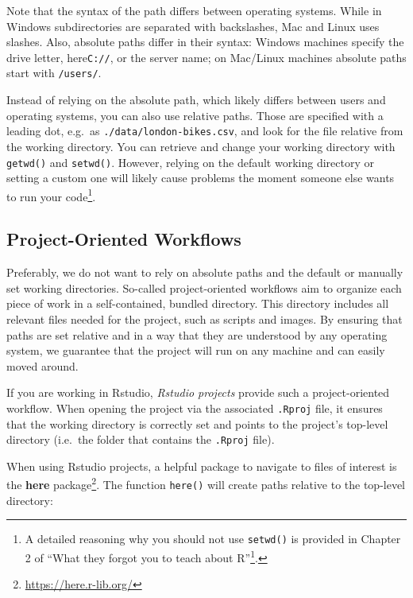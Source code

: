 \documentclass[
]{krantz}
\renewcommand{\href}[2]{#2\footnote{\url{#1}}}
\begin{document}
Note that the syntax of the path differs between operating systems. While in Windows subdirectories are separated with backslashes, Mac and Linux uses slashes. Also, absolute paths differ in their syntax: Windows machines specify the drive letter, here\texttt{C://}, or the server name; on Mac/Linux machines absolute paths start with \texttt{/users/}.

Instead of relying on the absolute path, which likely differs between users and operating systems, you can also use relative paths. Those are specified with a leading dot, e.g.~as \texttt{./data/london-bikes.csv}, and look for the file relative from the working directory. You can retrieve and change your working directory with \texttt{getwd()} and \texttt{setwd()}. However, relying on the default working directory or setting a custom one will likely cause problems the moment someone else wants to run your code\footnote{A detailed reasoning why you should not use \texttt{setwd()} is provided in \href{https://rstats.wtf/project-oriented-workflow.html}{Chapter 2 of ``What they forgot you to teach about R''}.}.

\hypertarget{workflows}{%
\subsection{Project-Oriented Workflows}\label{workflows}}

Preferably, we do not want to rely on absolute paths and the default or manually set working directories. So-called project-oriented workflows aim to organize each piece of work in a self-contained, bundled directory. This directory includes all relevant files needed for the project, such as scripts and images. By ensuring that paths are set relative and in a way that they are understood by any operating system, we guarantee that the project will run on any machine and can easily moved around.

If you are working in Rstudio, \emph{Rstudio projects} provide such a project-oriented workflow. When opening the project via the associated \texttt{.Rproj} file, it ensures that the working directory is correctly set and points to the project's top-level directory (i.e.~the folder that contains the \texttt{.Rproj} file).

When using Rstudio projects, a helpful package to navigate to files of interest is the \href{https://here.r-lib.org/}{\textbf{here} package}. The function \texttt{here()} will create paths relative to the top-level directory:
\end{document}
